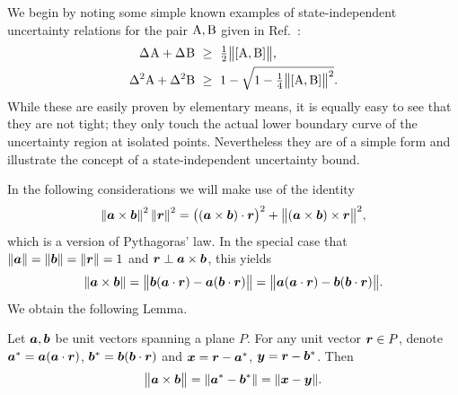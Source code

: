 We begin by noting some simple known examples of state-independent uncertainty relations for the pair $\operatorname{A},\operatorname{B}$ given in Ref.~\cite{BuschLahtiWerner2014}:
\begin{align}
  \label{eqn:straight-lower-bound-blw}
  \sdev{\opa}+\sdev{\opb}\ &\ge \ \tfrac12\bigl\|[\opa,\opb]\bigr\|,\\
  \label{eqn:curved-lower-bound-blw}
  \var{\opa}+\var{\opb}\ &\ge \ 1-\sqrt{1-\tfrac14\bigl\|[\opa,\opb]\bigr\|^2}.
\end{align}
While these are easily proven by elementary means, it is equally easy to see that they are not tight; they only touch the actual lower boundary curve of the uncertainty region at isolated points. Nevertheless they are of a simple form and illustrate the concept of a state-independent uncertainty bound.

In the following considerations we will make use of the identity
\begin{equation}\label{eq:r2-id}
  \left\|\bm{a}\times\bm{b}\right\|^2 \left\|\bm{r}\right\|^2 = \bigl((\bm{a}\times\bm{b})\cdot\bm{r}\bigr)^2 + \bigl\|(\bm{a}\times\bm{b})\times\bm{r}\bigr\|^2 ,
\end{equation}
which is a version of Pythagoras' law. In the special case that $\|\bm{a}\|=\|\bm{b}\|=\|\bm{r}\|=1$ and $\bm{r}\perp\bm{a}\times\bm{b}$, this yields
\begin{equation}
  \left\|\bm{a}\times\bm{b}\right\| = \bigl\|\bm{b}(\bm{a}\cdot\bm{r})-\bm{a}(\bm{b}\cdot\bm{r})\bigr\| = \bigl\|\bm{a}(\bm{a}\cdot\bm{r})-\bm{b}(\bm{b}\cdot\bm{r})\bigr\|.
\end{equation}
We obtain the following Lemma.
\begin{lem}
  Let $\bm{a},\bm{b}$ be unit vectors spanning a plane $P$. For any unit vector $\bm{r}\in P$, denote $\bm{a}^*=\bm{a}(\bm{a}\cdot\bm{r})$,  $\bm{b}^*=\bm{b}(\bm{b}\cdot\bm{r})$ and $\bm{x}=\bm{r}-\bm{a}^*$, $\bm{y}=\bm{r}-\bm{b}^*$. Then
  \begin{equation}\label{eq:axb}
    \bigl\|\bm{a}\times\bm{b}\bigr\| = \|\bm{a}^*-\bm{b}^*\|=\|\bm{x}-\bm{y}\|.
  \end{equation}
\end{lem}


